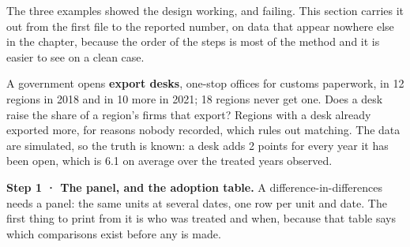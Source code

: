 \documentclass[
  letterpaper,
  10pt,
  twoside,
  openright,
  numbers=noenddot,
  chapterprefix=true]{scrbook}
\begin{document}
The three examples showed the design working, and failing. This section
carries it out from the first file to the reported number, on data that
appear nowhere else in the chapter, because the order of the steps is
most of the method and it is easier to see on a clean case.

A government opens \textbf{export desks}, one-stop offices for customs
paperwork, in 12 regions in 2018 and in 10 more in 2021; 18 regions
never get one. Does a desk raise the share of a region's firms that
export? Regions with a desk already exported more, for reasons nobody
recorded, which rules out matching. The data are simulated, so the truth
is known: a desk adds 2 points for every year it has been open, which is
6.1 on average over the treated years observed.

\textbf{Step 1 · The panel, and the adoption table.} A
difference-in-differences needs a panel: the same units at several
dates, one row per unit and date. The first thing to print from it is
who was treated and when, because that table says which comparisons
exist before any is made.
\end{document}
